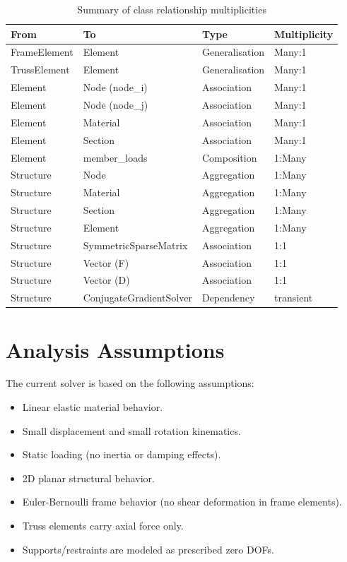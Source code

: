 \begin{table}[h!]
\centering
\caption{Summary of class relationship multiplicities}
\begin{tabular}{llll}
\hline
\textbf{From} & \textbf{To} & \textbf{Type} & \textbf{Multiplicity} \\
\hline
FrameElement   & Element              & Generalisation     & Many:1  \\
TrussElement   & Element              & Generalisation     & Many:1  \\
Element        & Node (node\_i)       & Association        & Many:1  \\
Element        & Node (node\_j)       & Association        & Many:1  \\
Element        & Material             & Association        & Many:1  \\
Element        & Section              & Association        & Many:1  \\
Element        & member\_loads        & Composition        & 1:Many  \\
Structure      & Node                 & Aggregation        & 1:Many  \\
Structure      & Material             & Aggregation        & 1:Many  \\
Structure      & Section              & Aggregation        & 1:Many  \\
Structure      & Element              & Aggregation        & 1:Many  \\
Structure      & SymmetricSparseMatrix& Association        & 1:1     \\
Structure      & Vector (F)           & Association        & 1:1     \\
Structure      & Vector (D)           & Association        & 1:1     \\
Structure      & ConjugateGradientSolver & Dependency      & transient \\
\hline
\end{tabular}
\label{tab:multiplicities}
\end{table}


\section{Analysis Assumptions}
The current solver is based on the following assumptions:
\begin{itemize}
    \item Linear elastic material behavior.
    \item Small displacement and small rotation kinematics.
    \item Static loading (no inertia or damping effects).
    \item 2D planar structural behavior.
    \item Euler-Bernoulli frame behavior (no shear deformation in frame elements).
    \item Truss elements carry axial force only.
    \item Supports/restraints are modeled as prescribed zero DOFs.
\end{itemize}

